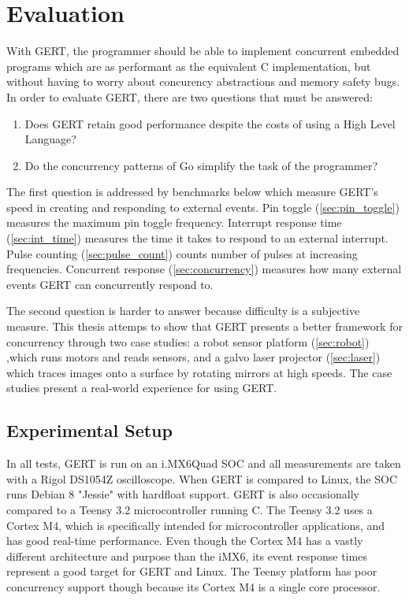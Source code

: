 \chapter{Evaluation}

With GERT, the programmer should be able to implement concurrent embedded programs
which are as performant as the equivalent C implementation, but without having to
worry about concurency abstractions and memory safety bugs. In order to evaluate GERT,
there are two questions that must be answered:

\begin{enumerate}
  \item Does GERT retain good performance despite the costs of using a High Level Language?
  \item Do the concurrency patterns of Go simplify the task of the programmer?
\end{enumerate}

The first question is addressed by benchmarks below which measure GERT's
speed in creating and responding to external events. Pin toggle (\ref{sec:pin_toggle})
measures the maximum pin toggle frequency. Interrupt response time (\ref{sec:int_time})
measures the time it takes to respond to an external interrupt. Pulse counting
(\ref{sec:pulse_count}) counts number of pulses at increasing frequencies.
Concurrent response (\ref{sec:concurrency}) measures how many external events
GERT can concurrently respond to.

The second question is harder to answer because difficulty is a subjective
measure. This thesis attemps to show that GERT presents a better framework for
concurrency through two case studies: a robot sensor platform (\ref{sec:robot})
,which runs motors and reads sensors, and a galvo laser projector (\ref{sec:laser})
which traces images onto a surface by rotating mirrors at high speeds. The case studies
present a real-world experience for using GERT.

\section{Experimental Setup} \label{sec:setup}
In all tests, GERT is run on an i.MX6Quad SOC and all measurements are taken
with a Rigol DS1054Z oscilloscope. When GERT is compared to Linux, the SOC
runs Debian 8 "Jessie" with hardfloat support. GERT is also occasionally
compared to a Teensy 3.2 microcontroller running C. The Teensy 3.2 uses a Cortex M4, which is specifically
intended for microcontroller applications, and has good real-time performance. Even though
the Cortex M4 has a vastly different architecture and purpose than the iMX6, its event
response times represent a good target for GERT and Linux.
The Teensy platform
has poor concurrency support though because its Cortex M4 is a single core processor.



